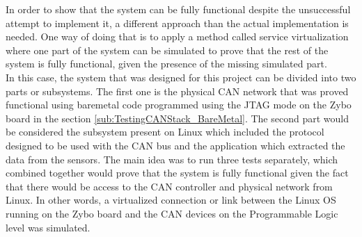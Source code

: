 In order to show that the system can be fully functional despite the unsuccessful attempt to implement it, a different approach than the actual implementation is needed.
One way of doing that is to apply a method called service virtualization where one part of the system can be simulated to prove that the rest of the system is fully functional, given the presence of the missing simulated part.
\\
In this case, the system that was designed for this project can be divided into two parts or subsystems.
The first one is the physical CAN network that was proved functional using bare\-metal code programmed using the JTAG mode  on the Zybo board in the section \ref{sub:TestingCANStack_BareMetal}.
The second part would be considered the subsystem present on Linux which included the protocol designed to be used with the CAN bus and the application which extracted the data from the sensors.
The main idea was to run three tests separately, which combined together would prove that the system is fully functional given the fact that there would be access to the CAN controller and physical network from Linux. In other words, a virtualized connection or link between the Linux OS running on the Zybo board and the CAN devices on the Programmable Logic level  was simulated.
